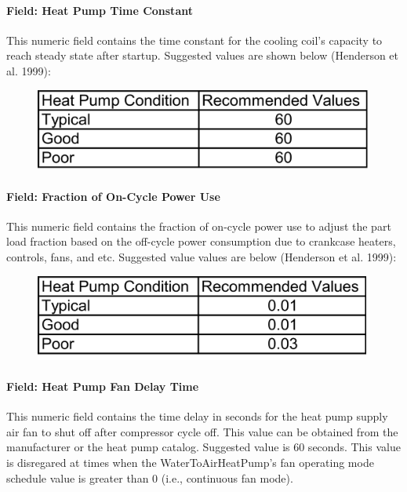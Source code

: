 \paragraph{Field: Heat Pump Time Constant}\label{field-heat-pump-time-constant-001}

This numeric field contains the time constant for the cooling coil's capacity to reach steady state after startup. Suggested values are shown below (Henderson et al. 1999):

\begin{figure}[htbp]
\centering
\includegraphics{media/image290.png}
\caption{}
\end{figure}

\paragraph{Field: Fraction of On-Cycle Power Use}\label{field-fraction-of-on-cycle-power-use-001}

This numeric field contains the fraction of on-cycle power use to adjust the part load fraction based on the off-cycle power consumption due to crankcase heaters, controls, fans, and etc. Suggested value values are below (Henderson et al. 1999):

\begin{figure}[htbp]
\centering
\includegraphics{media/image291.png}
\caption{}
\end{figure}

\paragraph{Field: Heat Pump Fan Delay Time}\label{field-heat-pump-fan-delay-time-001}

This numeric field contains the time delay in seconds for the heat pump supply air fan to shut off after compressor cycle off. This value can be obtained from the manufacturer or the heat pump catalog. Suggested value is 60 seconds. This value is disregared at times when the WaterToAirHeatPump's fan operating mode schedule value is greater than 0 (i.e., continuous fan mode).

